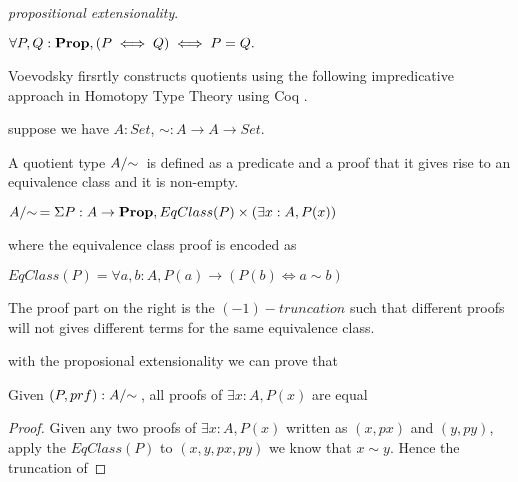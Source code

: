 \begin{definition}
\emph{propositional extensionality}.

$\forall P, Q : \operatorname{\mathbf{Prop}}, (P \iff Q) \iff P = Q.$

\end{definition}

Voevodsky
firsrtly constructs quotients using the following impredicative approach in Homotopy Type Theory using Coq
\cite{voe:hset}.





suppose we have $A : Set$, $\sim : A \rightarrow A \rightarrow Set$.

A quotient type $\qset{A}$ is defined as a predicate and a proof that
it gives rise to an equivalence class and it is non-empty.

$\qset{A} = \Sigma P : A \rightarrow \Prop, EqClass (P) \times (\exists x : A, P (x))$

where the equivalence class proof is encoded as

$EqClass (P) = \forall a, b : A, P(a) \rightarrow (P(b) \iff a \sim b)$

The proof part on the right is the $(-1)-truncation$ such that
different proofs will not gives different terms for the same
equivalence class.


with the proposional extensionality we can prove that
\begin{theorem}
Given $(P , prf) : \qset{A}$, all proofs of $\exists x : A, P (x)$ are equal
\end{theorem}

\begin{proof}
Given any two proofs of $\exists x : A, P (x)$ written as $(x , px)$ and $(y
, py)$, apply the $EqClass(P)$ to $(x, y, px, py)$ we know that $x
\sim y$. Hence the truncation of 
\end{proof}




